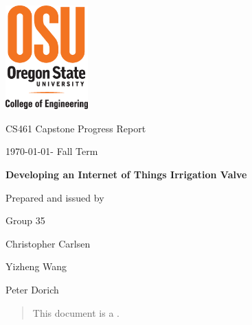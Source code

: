 \documentclass[onecolumn, draftclsnofoot,10pt, compsoc]{IEEEtran}
\def \CapstoneTeamName{     Group}
\def \CapstoneTeamNumber{       35}
\def \GroupMemberOne{           Christopher Carlsen}
\def \GroupMemberTwo{           Yizheng Wang}
\def \GroupMemberThree{         Peter Dorich}
\def \CapstoneProjectName{      Developing an Internet of Things Irrigation Valve}
\def \CapstoneSponsorCompany{       OSU \textbar\hspace{.05in} Openly Published Environmental Sensing (OPEnS) Lab}
\def \CapstoneSponsorPerson{        Chet Udell}
\def \DocType{      %
    Progress Report
}
\newcommand{\NameSigPair}[1]{\par
    \makebox[2.75in][r]{#1} \hfil   \makebox[3.25in]{\makebox[2.25in]{\hrulefill} \hfill        \makebox[.75in]{\hrulefill}}
    \par\vspace{-12pt} \textit{\tiny\noindent
        \makebox[2.75in]{} \hfil        \makebox[3.25in]{\makebox[2.25in][r]{Signature} \hfill  \makebox[.75in][r]{Date}}}}
\renewcommand{\NameSigPair}[1]{#1}
\begin{document}
    \begin{titlepage}
        \begin{singlespace}
            \includegraphics[height=4cm]{coe_v_spot1}
            \hfill 
            \par\vspace{.2in}
            \centering
            \scshape{
                \huge CS461 Capstone \DocType \par
                {\large\today - Fall Term}\par
                \vspace{.5in}
                \textbf{\Huge\CapstoneProjectName}\par
                \vfill
                {\large Prepared and issued by }\par
                Group\CapstoneTeamNumber\par
                \vspace{5pt}
                {\Large
                    \NameSigPair{\GroupMemberOne}\par
                    \NameSigPair{\GroupMemberTwo}\par
                    \NameSigPair{\GroupMemberThree}\par
                }
                \vspace{20pt}
            }
            \begin{abstract}
                This document is a .
            \end{abstract}     
        \end{singlespace}
    \end{titlepage}
    \newpage
    \tableofcontents
    \clearpage
    
\end{document}
